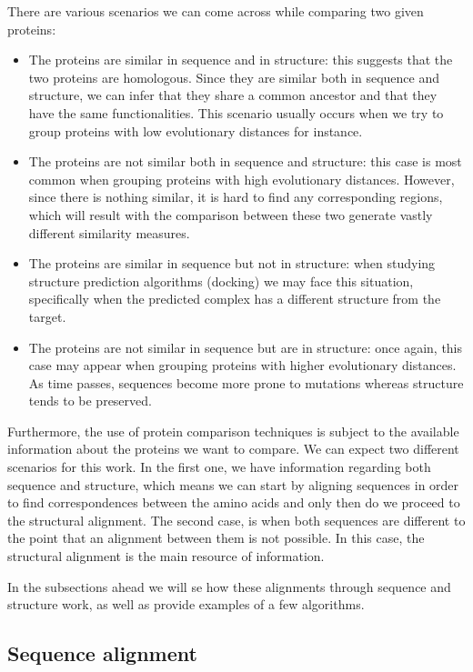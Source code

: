 There are various scenarios we can come across while comparing two given proteins:
\begin{itemize}
	\item The proteins are similar in sequence and in structure: this suggests that the two proteins are homologous. Since they are similar both in sequence and structure, we can infer that they share a common ancestor and that they have the same functionalities. This scenario usually occurs when we try to group proteins with low evolutionary distances for instance. 
	
	\item The proteins are not similar both in sequence and structure: this case is most common when grouping proteins with high evolutionary distances. However, since there is nothing similar, it is hard to find any corresponding regions, which will result with the comparison between these two generate vastly different similarity measures.
		
	\item The proteins are similar in sequence but not in structure: when studying structure prediction algorithms (docking) we may face this situation, specifically when the predicted complex has a different structure from the target.
	
	\item The proteins are not similar in sequence but are in structure: once again, this case may appear when grouping proteins with higher evolutionary distances. As time passes, sequences become more prone to mutations whereas structure tends to be preserved. 
\end{itemize}

Furthermore, the use of protein comparison techniques is subject to the available information about the proteins we want to compare. We can expect two different scenarios for this work. In the first one, we have information regarding both sequence and structure, which means we can start by aligning sequences in order to find correspondences between the amino acids and only then do we proceed to the structural alignment. The second case, is when both sequences are different to the point that an alignment between them is not possible. In this case, the structural alignment is the main resource of information.

In the subsections ahead we will se how these alignments through sequence and structure work, as well as provide examples of a few algorithms.

\subsection{Sequence alignment}

